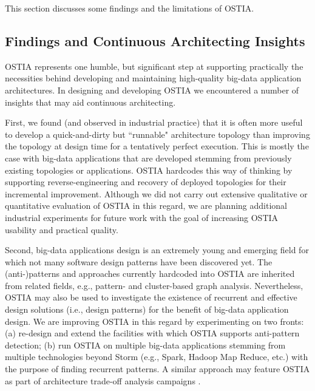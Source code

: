 This section discusses some findings and the limitations of OSTIA.

\subsection{Findings and Continuous Architecting Insights}
OSTIA represents one humble, but significant step at supporting practically the necessities behind developing and maintaining high-quality big-data application architectures. In designing and developing OSTIA we encountered a number of insights that may aid continuous architecting.

First, we found (and observed in industrial practice) that it is often more useful to develop a quick-and-dirty but ``runnable" architecture topology than improving the topology at design time for a tentatively perfect execution. This is mostly the case with big-data applications that are developed stemming from previously existing topologies or applications. OSTIA hardcodes this way of thinking by supporting reverse-engineering and recovery of deployed topologies for their incremental improvement. Although we did not carry out extensive qualitative or quantitative evaluation of OSTIA in this regard, we are planning additional industrial experiments for future work with the goal of increasing OSTIA usability and practical quality.

Second, big-data applications design is an extremely young and emerging field for which not many software design patterns have been discovered yet. The (anti-)patterns and approaches currently hardcoded into OSTIA are inherited from related fields, e.g., pattern- and cluster-based graph analysis. Nevertheless, OSTIA may also be used to investigate the existence of recurrent and effective design solutions (i.e., design patterns) for the benefit of big-data application design. We are improving OSTIA in this regard by experimenting on two fronts: (a) re-design and extend the facilities with which OSTIA supports anti-pattern detection; (b) run OSTIA on multiple big-data applications stemming from multiple technologies beyond Storm (e.g., Spark, Hadoop Map Reduce, etc.) with the purpose of finding recurrent patterns. A similar approach may feature OSTIA as part of architecture trade-off analysis campaigns \cite{atam}.

